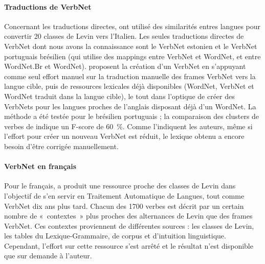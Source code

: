 \paragraph{Traductions de VerbNet}

Concernant les traductions directes, \cite{merlo2002multilingual} ont utilisé
des similarités entres langues pour convertir 20 classes de Levin vers
l'Italien. Les seules traductions directes de VerbNet dont nous avons la
connaissance sont le VerbNet estonien \citep{jentson2014verbnet} et le VerbNet
portuguais brésilien \citep{scarton2012towards} (qui utilise des mappings entre
VerbNet et WordNet, et entre WordNet.Br et WordNet). \cite{scarton2014using}
proposent la création d'un VerbNet en s'appuyant comme seul effort manuel sur
la traduction manuelle des frames VerbNet vers la langue cible, puis de
ressources lexicales déjà disponibles (WordNet, VerbNet et WordNet traduit dans
la langue cible), le tout dans l'optique de créer des VerbNets pour les langues
proches de l'anglais disposant déjà d'un WordNet.  La méthode a été testée pour
le brésilien portuguais ; la comparaison des clusters de verbes de
\citep{scarton2012towards} indique un F-score de 60~\%.  Comme l'indiquent les
auteurs, même si l'effort pour créer un nouveau VerbNet est réduit, le lexique
obtenu a encore besoin d'être corrigée manuellement.

\paragraph{VerbNet en français}

Pour le français, \cite{saintdizier1996constructing} a produit une ressource
proche des classes de Levin dans l'objectif de s'en servir en Traitement
Automatique de Langues, tout comme VerbNet dix ans plus tard. Chacun des 1700
verbes est décrit par un certain nombre de «~contextes~» plus proches des
alternances de Levin que des frames VerbNet. Ces contextes proviennent de
différentes sources : les classes de Levin, les tables du Lexique-Grammaire, de
corpus et d'intuition linguistique. Cependant, l'effort sur cette ressource
s'est arrêté et le résultat n'est disponible que sur demande à l'auteur.

